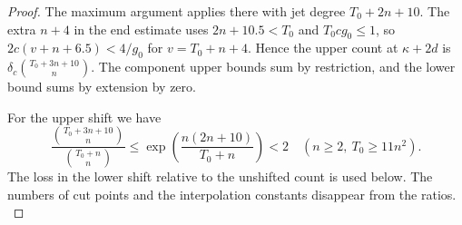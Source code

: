 \begin{proof}
The maximum argument applies
there with jet degree $T_0+2n+10$. The extra $n+4$ in the
end estimate uses $2n+10.5<T_0$ and $T_0cg_0\le1$, so
$2c(v+n+6.5)<4/g_0$ for $v=T_0+n+4$. Hence the upper count at $\kappa+2d$ is
$\delta_c\binom{T_0+3n+10}{n}$. The component upper bounds
sum by restriction, and the lower bound sums by extension by zero.

For the upper shift we have
\[
 \frac{\binom{T_0+3n+10}{n}}{\binom{T_0+n}{n}}
 \le \exp\left(\frac{n(2n+10)}{T_0+n}\right)<2
 \quad(n\ge2,\ T_0\ge 11n^2).
\]
The loss in the lower shift relative to the unshifted count is
used below. The numbers of cut points and the interpolation
constants disappear from the ratios.
\label{cor:paired-cusp-ranks-9}
\end{proof}
